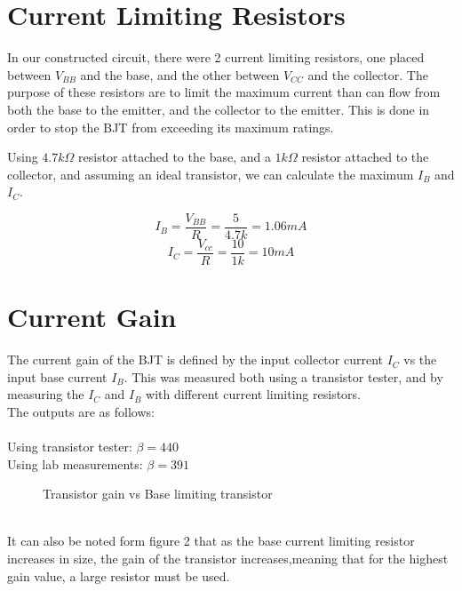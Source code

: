 \documentclass[a4paper,11pt]{article}
\begin{document}
\section{Current Limiting Resistors}

In our constructed circuit, there were 2 current limiting resistors, one placed between $V_{BB}$ and the base, and the other between $V_{CC}$ and the collector. The purpose of these resistors are to limit the maximum current than can flow from both the base to the emitter, and the collector to the emitter. This is done in order to stop the BJT from exceeding its maximum ratings. 

Using $4.7k\Omega$ resistor attached to the base, and a $1k\Omega$ resistor attached to the collector, and assuming an ideal transistor, we can calculate the maximum $I_{B}$ and $I_{C}$.

$$I_B =  \frac{V_{BB}}{R} = \frac{5}{4.7k} = 1.06mA$$
$$I_C =  \frac{V_{cc}}{R} = \frac{10}{1k} = 10mA$$

\pagebreak
\section{Current Gain}

The current gain of the BJT is defined by the input collector current $I_C$ vs the input base current $I_B$. This was measured both using a transistor tester, and by measuring the $I_C$ and $I_B$ with different current limiting resistors. \\

The outputs are as follows:\\\\
Using transistor tester: $\beta = 440$\\
Using lab measurements: $\beta = 391$\\
\begin{figure}
\vspace{-110pt}
\begin{center}
\end{center}
\vspace{-20pt}
\caption{Transistor gain vs Base limiting transistor }
\end{figure}
\\
It can also be noted form figure 2 that as the base current limiting resistor increases in size, the gain of the transistor increases,meaning that for the highest gain value, a large resistor must be used.\\\\\\
\end{document}
